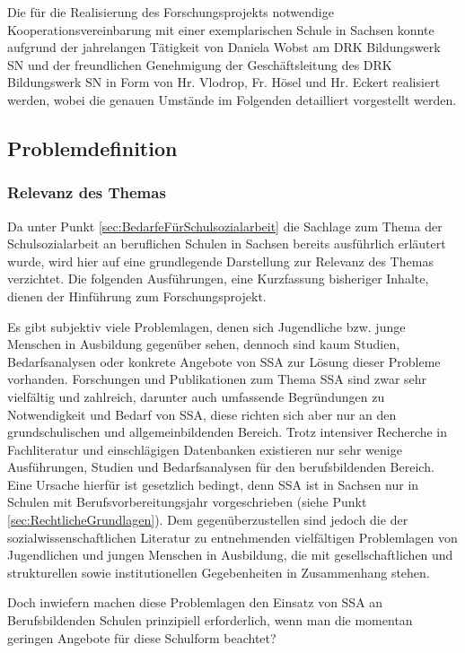 Die für die Realisierung des Forschungsprojekts notwendige Kooperationsvereinbarung mit einer exemplarischen Schule in Sachsen konnte aufgrund der jahrelangen Tätigkeit von Daniela Wobst am DRK Bildungswerk SN und der freundlichen Genehmigung der Geschäftsleitung des DRK Bildungswerk SN in Form von Hr. Vlodrop, Fr. Hösel und Hr. Eckert realisiert werden, wobei die genauen Umstände im Folgenden detailliert vorgestellt werden.

\subsection{Problemdefinition}
\label{sec:Problemdefinition}

\subsubsection{Relevanz des Themas}
\label{sec:RelevanzDesThemas}

Da unter Punkt \ref{sec:BedarfeFürSchulsozialarbeit} die Sachlage zum Thema der Schulsozialarbeit an beruflichen Schulen in Sachsen bereits ausführlich erläutert wurde, wird hier auf eine grundlegende Darstellung zur Relevanz des Themas verzichtet. Die folgenden Ausführungen, eine Kurzfassung bisheriger Inhalte, dienen der Hinführung zum Forschungsprojekt.

Es gibt subjektiv viele Problemlagen, denen sich Jugendliche bzw. junge Menschen in Ausbildung gegenüber sehen, dennoch sind kaum Studien, Bedarfsanalysen oder konkrete Angebote von SSA zur Lösung dieser Probleme vorhanden. Forschungen und Publikationen zum Thema SSA sind zwar sehr vielfältig und zahlreich, darunter auch umfassende Begründungen zu Notwendigkeit und Bedarf von SSA, diese richten sich aber nur an den grundschulischen und allgemeinbildenden Bereich. Trotz intensiver Recherche in Fachliteratur und einschlägigen Datenbanken existieren nur sehr wenige Ausführungen, Studien und Bedarfsanalysen für den berufsbildenden Bereich. Eine Ursache hierfür ist gesetzlich bedingt, denn SSA ist in Sachsen nur in Schulen mit Berufsvorbereitungsjahr vorgeschrieben (siehe Punkt \ref{sec:RechtlicheGrundlagen}). Dem gegenüberzustellen sind jedoch die der sozialwissenschaftlichen Literatur zu entnehmenden vielfältigen Problemlagen von Jugendlichen und jungen Menschen in Ausbildung, die mit gesellschaftlichen und strukturellen sowie institutionellen Gegebenheiten in Zusammenhang stehen. 

Doch inwiefern machen diese Problemlagen den Einsatz von SSA an Berufsbildenden Schulen prinzipiell erforderlich, wenn man die momentan geringen Angebote für diese Schulform beachtet? 

